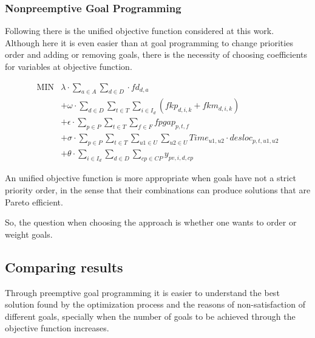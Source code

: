 \subsubsection{Nonpreemptive Goal Programming}

Following there is the unified objective function considered at this work. Although here it is even easier than at goal programming to change priorities order and adding or removing goals, there is the necessity of choosing coefficients for variables at objective function.

$$
\begin{array}{rl}
   \mbox{MIN} &
			\lambda \cdot \sum\limits_{a \in A}\sum\limits_{d \in D} \cdot fd_{d,a}
      \\
      &
      + \omega \cdot \sum\limits_{d \in D} 
\sum\limits_{t \in T} \sum\limits_{i \in I_{d}} (fkp_{d,i,k} + fkm_{d,i,k})
      \\
      &
      + \epsilon \cdot \sum\limits_{p \in P} \sum\limits_{t \in T} \sum\limits_{f \in F} fpgap_{p,t,f}
      \\
      &
			+ \sigma \cdot \sum\limits_{p \in P} \sum\limits_{t \in T} \sum\limits_{u1 \in U} \sum\limits_{u2 \in U} Time_{u1,u2} \cdot desloc_{p,t,u1,u2}
			\\
			&
      + \theta \cdot \sum\limits_{i \in I_{d}} \sum\limits_{d \in D} \sum\limits_{cp \in CP} y_{pv,i,d,cp}
\end{array}
$$


An unified objective function is more appropriate when goals have not a strict priority order, in the sense that their combinations can produce solutions that are Pareto efficient.

So, the question when choosing the approach is whether one wants to order or weight goals.


\subsection{Comparing results}

Through preemptive goal programming it is easier to understand the best solution found by the optimization process and the reasons of non-satisfaction of different goals, specially when the number of goals to be achieved through the objective function increases.





